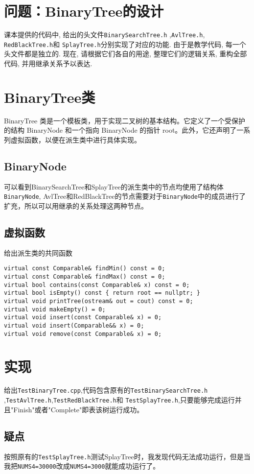 \documentclass[twoside,a4paper,10pt]{article}
\begin{document}
\pagestyle{fancy}
\fancyhead{}
\rhead{\today}


\section*{问题：BinaryTree的设计}
课本提供的代码中, 给出的头文件\texttt{BinarySearchTree.h} ,\texttt{AvlTree.h},\texttt{ RedBlackTree.h}和 \texttt{SplayTree.h}分别实现了对应的功能. 由于是教学代码, 每一个头文件都是独立的. 现在, 请根据它们各自的用途, 整理它们的逻辑关系, 重构全部代码, 并用继承关系予以表达.

\section{BinaryTree类}
BinaryTree 类是一个模板类，用于实现二叉树的基本结构。它定义了一个受保护的结构 BinaryNode 和一个指向 BinaryNode 的指针 root。此外，它还声明了一系列虚拟函数，以便在派生类中进行具体实现。

\subsection{BinaryNode}
可以看到BinarySearchTree和SplayTree的派生类中的节点均使用了结构体\texttt{BinaryNode}, AvlTree和RedBlackTree的节点需要对于\texttt{BinaryNode}中的成员进行了扩充，所以可以用继承的关系处理这两种节点。

\subsection{虚拟函数}
给出派生类的共同函数
\begin{verbatim}
virtual const Comparable& findMin() const = 0;
virtual const Comparable& findMax() const = 0;
virtual bool contains(const Comparable& x) const = 0;
virtual bool isEmpty() const { return root == nullptr; }
virtual void printTree(ostream& out = cout) const = 0;
virtual void makeEmpty() = 0;
virtual void insert(const Comparable& x) = 0;
virtual void insert(Comparable&& x) = 0;
virtual void remove(const Comparable& x) = 0;
\end{verbatim}

\section{实现}
给出\texttt{TestBinaryTree.cpp},代码包含原有的\texttt{TestBinarySearchTree.h} ,\texttt{TestAvlTree.h},\texttt{TestRedBlackTree.h}和 \texttt{TestSplayTree.h},只要能够完成运行并且"Finish"或者"Complete"即表该树运行成功。

\subsection{疑点}
按照原有的\texttt{TestSplayTree.h}测试SplayTree时，我发现代码无法成功运行，但是当我把\texttt{NUMS4=30000}改成\texttt{NUMS4=3000}就能成功运行了。
\end{document}
